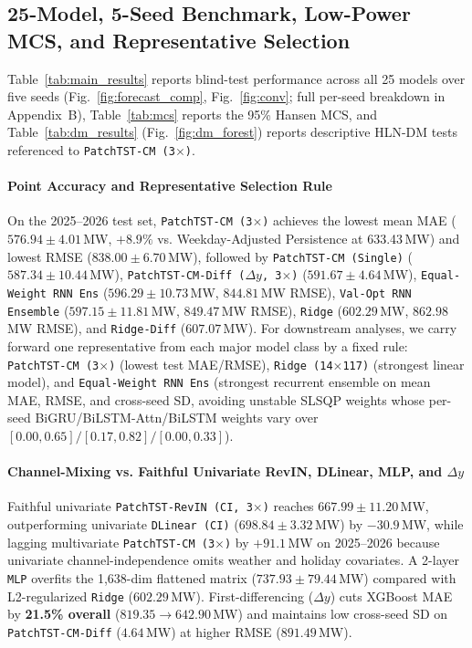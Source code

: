 \documentclass[5p,twocolumn,authoryear]{elsarticle}
\begin{document}
\subsection{25-Model, 5-Seed Benchmark, Low-Power MCS, and Representative Selection}
Table~\ref{tab:main_results} reports blind-test performance across all 25 models over five seeds (Fig.~\ref{fig:forecast_comp}, Fig.~\ref{fig:conv}; full per-seed breakdown in Appendix~B), Table~\ref{tab:mcs} reports the 95\% Hansen MCS, and Table~\ref{tab:dm_results} (Fig.~\ref{fig:dm_forest}) reports descriptive HLN-DM tests referenced to \texttt{PatchTST-CM (3$\times$)}.

\paragraph{Point Accuracy and Representative Selection Rule}
On the 2025--2026 test set, \texttt{PatchTST-CM (3$\times$)} achieves the lowest mean MAE ($576.94 \pm 4.01$\,MW, $+8.9\%$ vs. Weekday-Adjusted Persistence at 633.43\,MW) and lowest RMSE ($838.00 \pm 6.70$\,MW), followed by \texttt{PatchTST-CM (Single)} ($587.34 \pm 10.44$\,MW), \texttt{PatchTST-CM-Diff ($\Delta y$, 3$\times$)} ($591.67 \pm 4.64$\,MW), \texttt{Equal-Weight RNN Ens} ($596.29 \pm 10.73$\,MW, $844.81$\,MW RMSE), \texttt{Val-Opt RNN Ensemble} ($597.15 \pm 11.81$\,MW, $849.47$\,MW RMSE), \texttt{Ridge} ($602.29$\,MW, $862.98$\,MW RMSE), and \texttt{Ridge-Diff} ($607.07$\,MW). For downstream analyses, we carry forward one representative from each major model class by a fixed rule: \texttt{PatchTST-CM (3$\times$)} (lowest test MAE/RMSE), \texttt{Ridge (14$\times$117)} (strongest linear model), and \texttt{Equal-Weight RNN Ens} (strongest recurrent ensemble on mean MAE, RMSE, and cross-seed SD, avoiding unstable SLSQP weights whose per-seed BiGRU/BiLSTM-Attn/BiLSTM weights vary over $[0.00, 0.65] / [0.17, 0.82] / [0.00, 0.33]$).

\paragraph{Channel-Mixing vs. Faithful Univariate RevIN, DLinear, MLP, and $\Delta y$}
Faithful univariate \texttt{PatchTST-RevIN (CI, 3$\times$)} reaches $667.99 \pm 11.20$\,MW, outperforming univariate \texttt{DLinear (CI)} ($698.84 \pm 3.32$\,MW) by $-30.9$\,MW, while lagging multivariate \texttt{PatchTST-CM (3$\times$)} by $+91.1$\,MW on 2025--2026 because univariate channel-independence omits weather and holiday covariates. A 2-layer \texttt{MLP} overfits the 1,638-dim flattened matrix ($737.93 \pm 79.44$\,MW) compared with L2-regularized \texttt{Ridge} ($602.29$\,MW). First-differencing ($\Delta y$) cuts XGBoost MAE by \textbf{21.5\% overall} ($819.35 \to 642.90$\,MW) and maintains low cross-seed SD on \texttt{PatchTST-CM-Diff} ($4.64$\,MW) at higher RMSE ($891.49$\,MW).
\end{document}
